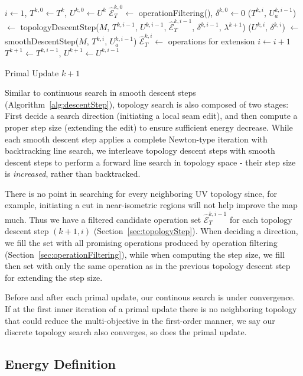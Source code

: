\begin{algorithm}[h]
\SetAlgoLined
{}
$i \leftarrow 1$, $T^{k,0} \leftarrow T^{k}$, $U^{k,0} \leftarrow U^{k}$\;
$\hat{\mathcal{E}}^{k,0}_T \leftarrow$ operationFiltering(), $\delta^{k,0} \leftarrow 0$\;
{
	($T^{k,i}$, $U_a^{k,i-1}$) $\leftarrow$ topologyDescentStep($M$, $T^{k,i-1}$, $U^{k,i-1}$, $\hat{\mathcal{E}}^{k,i-1}_T$, $\delta^{k,i-1}$, $\lambda^{k+1}$)\;
	($U^{k,i}$, $\delta^{k,i}$) $\leftarrow$ smoothDescentStep($M$, $T^{k,i}$, $U_a^{k,i-1}$)\;
	$\hat{\mathcal{E}}^{k,i}_T \leftarrow$ operations for extension\;
	$i \leftarrow i+1$\;
}
$T^{k+1} \leftarrow T^{k,i-1}$, $U^{k+1} \leftarrow U^{k,i-1}$
\caption{Primal Update $k+1$}
\label{alg:DCSearch}
\end{algorithm}

Similar to continuous search in smooth descent steps (Algorithm~\ref{alg:descentStep}), topology search is also composed of two stages: First decide a search direction (initiating a local seam edit), and then compute a proper step size (extending the edit) to ensure sufficient energy decrease. While each smooth descent step applies a complete Newton-type iteration with backtracking line search, we interleave topology descent steps with smooth descent steps to perform a forward line search in topology space - their step size is \emph{increased}, rather than backtracked.

There is no point in searching for every neighboring UV topology since, for example, initiating a cut in near-isometric regions will not help improve the map much. Thus we have a filtered candidate operation set $\hat{\mathcal{E}}^{k,i-1}_T$ for each topology descent step $(k+1,i)$ (Section~\ref{sec:topologyStep}). When deciding a direction, we fill the set with all promising operations produced by operation filtering (Section~\ref{sec:operationFiltering}), while when computing the step size, we fill then set with only the same operation as in the previous topology descent step for extending the step size.

Before and after each primal update, our continous search is under convergence. If at the first inner iteration of a primal update there is no neighboring topology that could reduce the multi-objective in the first-order manner, we say our discrete topology search also converges, so does the primal update.

\subsection{Energy Definition}

